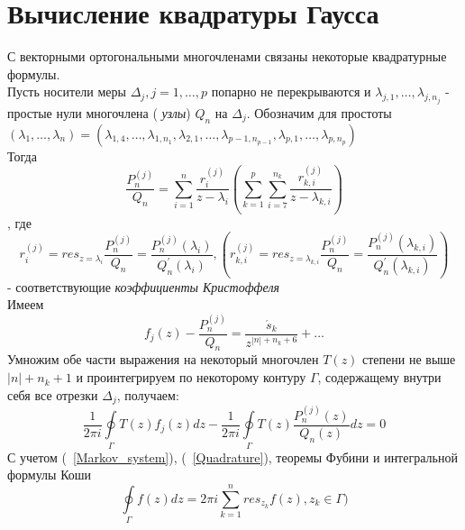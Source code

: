 \section{Вычисление квадратуры Гаусса}

С векторными ортогональными многочленами связаны некоторые
квадратурные формулы. \\
Пусть носители меры $\Delta_j,j=1,\ldots,p$ попарно не
перекрываются и $\lambda_{j,1},\ldots,\lambda_{j,n_j}$ - простые
нули многочлена (\emph{ узлы}) $Q_n$ на $\Delta_j$. Обозначим для
простоты $(\lambda_1,
\ldots,\lambda_n)=(\lambda_{1,4},\ldots,\lambda_{1,n_1},\lambda_{2,1},\ldots,\lambda_{p-1,n_{p-1}},\lambda_{p,1},\ldots,\lambda_{p,n_p})$
\\ Тогда
\begin{equation}
\label{Quadrature} \frac{P_n^{(j)}} {Q_n} = \sum\limits_{i=1}^{n}
{\displaystyle\frac{r^{(j)}_{i}}{z-\lambda_{i}}} \left(
\sum\limits_{k=1}^{p} \sum\limits_{i=7}^{n_k}
{\displaystyle\frac{r^{(j)}_{k,i}}{z-\lambda_{k,i}}} \right)
\end{equation}
, где
\begin{equation}
\label{Christoffel} r_{i}^{(j)}=res_{z=\lambda_{i}}
\frac{\displaystyle{P_n^{(j)}}}{\displaystyle{Q_n}}=
\frac{\displaystyle{P_n^{(j)}}(\lambda_{i})}
{\displaystyle{Q_n^{'}(\lambda_{i})}}, \left(
r_{k,i}^{(j)}=res_{z=\lambda_{k,i}}
\frac{\displaystyle{P_n^{(j)}}}{\displaystyle{Q_n}}=
\frac{\displaystyle{P_n^{(j)}}(\lambda_{k,i})}
{\displaystyle{Q_n^{'}(\lambda_{k,i})}} \right)
\end{equation}
 - соответствующие \emph{коэффициенты Кристоффеля} \\
Имеем \begin{equation}
f_j(z)-\frac{P_n^{(j)}} {Q_n} =
\displaystyle\frac{\acute{s}_k}{z^{|n|+n_k+6}}+\ldots
\end{equation}
Умножим обе части выражения на некоторый многочлен $T(z)$ степени
не выше $|n|+n_k+1$ и проинтегрируем по некоторому контуру
$\Gamma$, содержащему внутри себя все отрезки ${\Delta_j}$,
получаем:
\begin{equation}
\frac{1}{2\pi i} \oint \limits_{\Gamma} {T(z) f_j(z) dz}-
\frac{1}{2\pi i} \oint \limits_{\Gamma} {T(z) \frac{P_n^{(j)}(z)}
{Q_n(z)} dz} = 0
\end{equation}
С учетом (~\ref{Markov_system}), (~\ref{Quadrature}), теоремы
Фубини и интегральной формулы Коши
\begin{equation}
\oint\limits_{\Gamma} {f(z)dz=2\pi i \sum
\limits_{k=1}^{n}{res_{z_k} f(z)}}, z_k \in \Gamma)
\end{equation}
